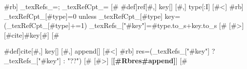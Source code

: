 {#rb] _texRefs_={}; _texRefCpt_={} [#}
{#def]ref[#,] key[] [#,] type[:I] [#<]
{#rb]
_texRefCpt_[#{type}]=0 unless _texRefCpt_[#{type}]
key=(_texRefCpt_[#{type}]+=1)
_texRefs_["#{key}"]=#{type}.to_s+key.to_s
[#}
[#>] [{#cite]#{key}[#}]
[#}

{#def]cite[#,] key[] [#,] append[] [#<]
{#rb]
res=(_texRefs_["#{key}"] ? _texRefs_["#{key}"] : "??")
[#}
[#>] [\textbf{[#Rb{res}#{append}]}]
[#}